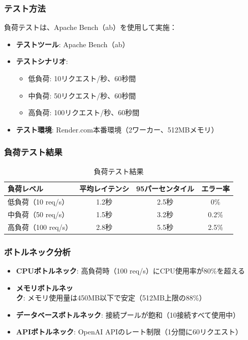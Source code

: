 \documentclass[a4paper,11pt,ja=standard,xelatex]{bxjsarticle}
\theoremstyle{definition}
\begin{document}
\subsubsection{テスト方法}

負荷テストは、Apache Bench（ab）を使用して実施：

\begin{itemize}
\item \textbf{テストツール}: Apache Bench（ab）
\item \textbf{テストシナリオ}: 
  \begin{itemize}
  \item 低負荷: 10リクエスト/秒、60秒間
  \item 中負荷: 50リクエスト/秒、60秒間
  \item 高負荷: 100リクエスト/秒、60秒間
  \end{itemize}
\item \textbf{テスト環境}: Render.com本番環境（2ワーカー、512MBメモリ）
\end{itemize}

\subsubsection{負荷テスト結果}

\begin{table}[!htbp]
\centering
\caption{負荷テスト結果}
\begin{tabular}{|l|c|c|c|}
\hline
\textbf{負荷レベル} & \textbf{平均レイテンシ} & \textbf{95パーセンタイル} & \textbf{エラー率} \\
\hline
低負荷（10 req/s） & 1.2秒 & 2.5秒 & 0\% \\
中負荷（50 req/s） & 1.5秒 & 3.2秒 & 0.2\% \\
高負荷（100 req/s） & 2.8秒 & 5.5秒 & 2.5\% \\
\hline
\end{tabular}
\end{table}

\subsubsection{ボトルネック分析}

\begin{itemize}
\item \textbf{CPUボトルネック}: 高負荷時（100 req/s）にCPU使用率が80\%を超える
\item \textbf{メモリボトルネック}: メモリ使用量は450MB以下で安定（512MB上限の88\%）
\item \textbf{データベースボトルネック}: 接続プールが飽和（10接続すべて使用中）
\item \textbf{APIボトルネック}: OpenAI APIのレート制限（1分間に60リクエスト）
\end{itemize}
\end{document}

